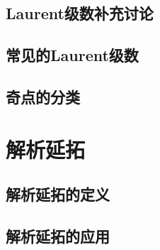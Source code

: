\documentclass[lang=cn, titlestyle=display, scheme=chinese]{elegantbook}
\begin{document}
            \subsection{Laurent级数补充讨论}

            \subsection{常见的Laurent级数}

            \subsection{奇点的分类}


        \section{解析延拓}

            \subsection{解析延拓的定义}

            \subsection{解析延拓的应用}
\end{document}
